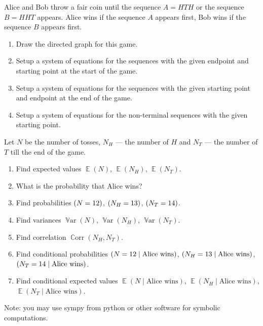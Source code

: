 \documentclass[12pt]{article}
\DeclareMathOperator{\Corr}{\mathbb{C}orr}
\DeclareMathOperator{\Var}{\mathbb{V}ar}
\let\P\relax
\DeclareMathOperator{\P}{\mathbb{P}}
\DeclareMathOperator{\E}{\mathbb{E}}
\begin{document}
\begin{exercise}
Alice and Bob throw a fair coin until the sequence $A = HTH$ or the sequence $B = HHT$ appears.
Alice wins if the sequence $A$ appears first, Bob wins if the sequence $B$ appears first.

\begin{enumerate}[label=\alph*)]
    \item Draw the directed graph for this game.
    \item Setup a system of equations for the sequences with the given endpoint and starting point at the start of the game. 
    \item Setup a system of equations for the sequences with the given starting point and endpoint at the end of the game. 
    \item Setup a system of equations for the non-terminal sequences with the given starting point.
\end{enumerate}
Let $N$ be the number of tosses, $N_H$ — the number of $H$ and $N_T$ — the number of $T$ till the end of the game. 
\begin{enumerate}[label=\alph*), resume]
    \item Find expected values $\E(N)$, $\E(N_H)$, $\E(N_T)$.
    \item What is the probability that Alice wins?
    \item Find probabilities $\P(N = 12)$, $\P(N_H = 13)$, $\P(N_T = 14)$.
    \item Find variances $\Var(N)$, $\Var(N_H)$, $\Var(N_T)$.
    \item Find correlation $\Corr(N_H, N_T)$.
    \item Find conditional probabilities $\P(N = 12 \mid \text{Alice wins})$, $\P(N_H = 13 \mid \text{Alice wins})$, $\P(N_T = 14 \mid \text{Alice wins})$.
    \item Find conditional expected values $\E(N \mid \text{Alice wins})$, $\E(N_H \mid \text{Alice wins})$, $\E(N_T\mid \text{Alice wins})$.
\end{enumerate}

Note: you may use sympy from python or other software for symbolic computations. 
\end{exercise}


\begin{exercise}
\end{exercise}


\begin{exercise}
\end{exercise}
\end{document}
